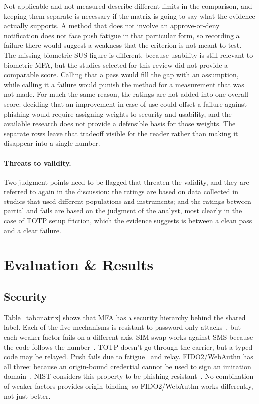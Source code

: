 \documentclass[sigconf]{acmart}
\begin{document}
Not applicable and not measured describe different limits in the comparison, and keeping them separate is necessary if the matrix is going to say what the evidence actually supports. A method that does not involve an approve-or-deny notification does not face push fatigue in that particular form, so recording a failure there would suggest a weakness that the criterion is not meant to test. The missing biometric SUS figure is different, because usability is still relevant to biometric MFA, but the studies selected for this review did not provide a comparable score. Calling that a pass would fill the gap with an assumption, while calling it a failure would punish the method for a measurement that was not made. For much the same reason, the ratings are not added into one overall score: deciding that an improvement in ease of use could offset a failure against phishing would require assigning weights to security and usability, and the available research does not provide a defensible basis for those weights. The separate rows leave that tradeoff visible for the reader rather than making it disappear into a single number.

\paragraph{Threats to validity.}
Two judgment points need to be flagged that threaten the
validity, and they are referred to again in the discussion: the ratings are based on data collected
in studies that used different populations and instruments; and the ratings between partial and
fails are based on the judgment of the analyst, most clearly in the case of TOTP setup friction,
which the evidence suggests is between a clean pass and a clear failure.

\section{Evaluation \& Results}

\subsection{Security}

Table~\ref{tab:matrix} shows that MFA has a security hierarchy behind the
shared label. Each of the five mechanisms is resistant to password-only
attacks~\cite{meyer:2023:mfa}, but each weaker factor fails on a different
axis. SIM-swap works against SMS because the code follows the
number~\cite{lee:2020:simswap}. TOTP doesn't go through the carrier, but
a typed code may be relayed. Push fails due to
fatigue~\cite{uber:2022:security} and relay. FIDO2/WebAuthn has all
three: because an origin-bound credential cannot be used to sign an
imitation domain~\cite{w3c:2021:webauthn2}, NIST considers this property
to be phishing-resistant~\cite{nist:2025:sp80063b4}. No
combination of weaker factors provides origin binding, so FIDO2/WebAuthn works differently, not just better.
\end{document}
